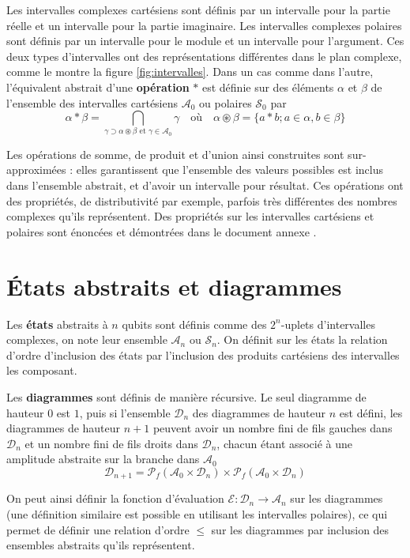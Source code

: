 Les intervalles complexes cartésiens sont définis par un intervalle pour la partie réelle et un intervalle pour la partie imaginaire. Les intervalles complexes polaires sont définis par un intervalle pour le module et un intervalle pour l'argument. Ces deux types d'intervalles ont des représentations différentes dans le plan complexe, comme le montre la figure \ref{fig:intervalles}. Dans un cas comme dans l'autre, l'équivalent abstrait d'une \textbf{opération} $*$ est définie sur des éléments $\alpha$ et $\beta$ de l'ensemble des intervalles cartésiens $\mathcal{A}_0$ ou polaires $\mathcal S_0$ par
$$\alpha * \beta = \bigcap_{\gamma \supset \alpha \circledast \beta\text{ et }\gamma \in \mathcal{A}_0} \gamma \quad \text{où} \quad \alpha \circledast \beta = \{a * b ; a \in \alpha, b \in \beta\}$$

Les opérations de somme, de produit et d'union ainsi construites sont sur-approximées : elles garantissent que l'ensemble des valeurs possibles est inclus dans l'ensemble abstrait, et d'avoir un intervalle pour résultat. Ces opérations ont des propriétés, de distributivité par exemple, parfois très différentes des nombres complexes qu'ils représentent. Des propriétés sur les intervalles cartésiens et polaires sont énoncées et démontrées dans le document annexe \cite{Leroy_2024}.

\section{États abstraits et diagrammes}

Les \textbf{états} abstraits à $n$ qubits sont définis comme des $2^n$-uplets d'intervalles complexes, on note leur ensemble $\mathcal A_n$ ou $\mathcal S_n$. On définit sur les états la relation d'ordre d'inclusion des états par l'inclusion des produits cartésiens des intervalles les composant.

Les \textbf{diagrammes} sont définis de manière récursive. Le seul diagramme de hauteur 0 est $\boxed 1$, puis si l'ensemble $\mathcal D_n$ des diagrammes de hauteur $n$ est défini, les diagrammes de hauteur $n+1$ peuvent avoir un nombre fini de fils gauches dans $\mathcal D_n$ et un nombre fini de fils droits dans $\mathcal D_n$, chacun étant associé à une amplitude abstraite sur la branche dans $\mathcal A_0$
$$\mathcal{D}_{n+1} = \mathscr{P}_f(\mathcal{A}_0 \times \mathcal{D}_n) \times \mathscr{P}_f(\mathcal{A}_0 \times \mathcal{D}_n)$$

On peut ainsi définir la fonction d'évaluation $\mathcal E : \mathcal D_n \to \mathcal A_n$ sur les diagrammes (une définition similaire est possible en utilisant les intervalles polaires), ce qui permet de définir une relation d'ordre $\le$ sur les diagrammes par inclusion des ensembles abstraits qu'ils représentent.

